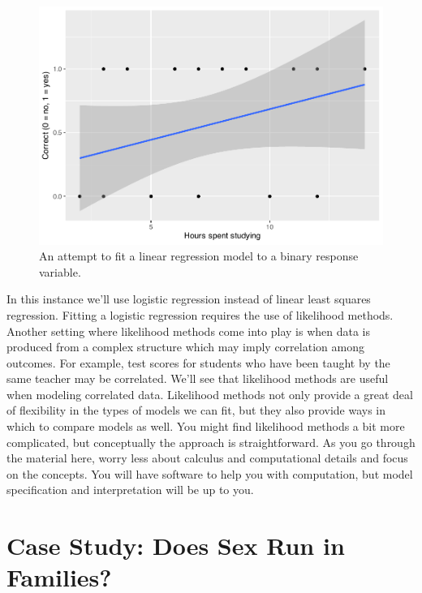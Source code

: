 \documentclass[
]{krantz}
\begin{document}
\begin{figure}

{\centering \includegraphics[width=0.9\linewidth]{bookdown-BeyondMLR_files/figure-latex/logistic1-1} 

}

\caption{An attempt to fit a linear regression model to a binary response variable.}\label{fig:logistic1}
\end{figure}

In this instance we'll use logistic regression instead of linear least squares regression. Fitting a logistic regression requires the use of likelihood methods. Another setting where likelihood methods come into play is when data is produced from a complex structure which may imply correlation among outcomes. For example, test scores for students who have been taught by the same teacher may be correlated. We'll see that likelihood methods are useful when modeling correlated data. Likelihood methods not only provide a great deal of flexibility in the types of models we can fit, but they also provide ways in which to compare models as well. You might find likelihood methods a bit more complicated, but conceptually the approach is straightforward. As you go through the material here, worry less about calculus and computational details and focus on the concepts. You will have software to help you with computation, but model specification and interpretation will be up to you.

\hypertarget{case-study-does-sex-run-in-families}{%
\section{Case Study: Does Sex Run in Families?}\label{case-study-does-sex-run-in-families}}
\end{document}
